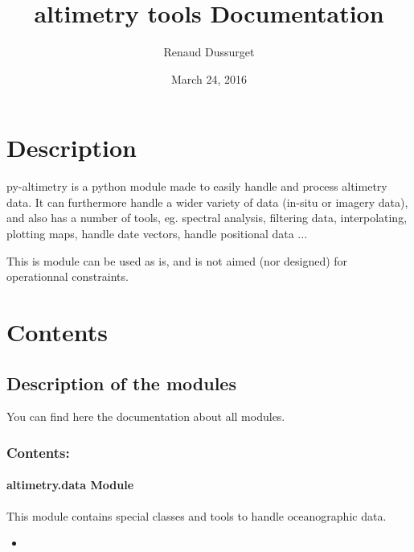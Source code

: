 \documentclass[letterpaper,10pt,english]{sphinxmanual}
\title{altimetry tools Documentation}
\date{March 24, 2016}
\author{Renaud Dussurget}
\begin{document}
\maketitle
\tableofcontents
{}\label{index::doc}



\chapter{Description}
\label{index:description}\label{index:welcome-to-altimetry-tools-s-documentation}
py-altimetry is a python module made to easily handle and process altimetry data.
It can furthermore handle a wider variety of data (in-situ or imagery data), and also has a number of tools, eg. spectral analysis, filtering data, interpolating, plotting maps, handle date vectors, handle positional data ...

This is module can be used as is, and is not aimed (nor designed) for operationnal constraints.


\chapter{Contents}
\label{index:contents}

\section{Description of the modules}
\label{Modules:description-of-the-modules}\label{Modules::doc}
You can find here the documentation about all modules.


\subsection{Contents:}
\label{Modules:contents}

\subsubsection{altimetry.data Module}
\label{altimetry.data:altimetry-data-module}\label{altimetry.data::doc}
This module contains special classes and tools to handle oceanographic data.
\begin{itemize}\setlength{\itemsep}{0pt}\setlength{\parskip}{0pt}
\item {} 

\end{itemize}
\end{document}
